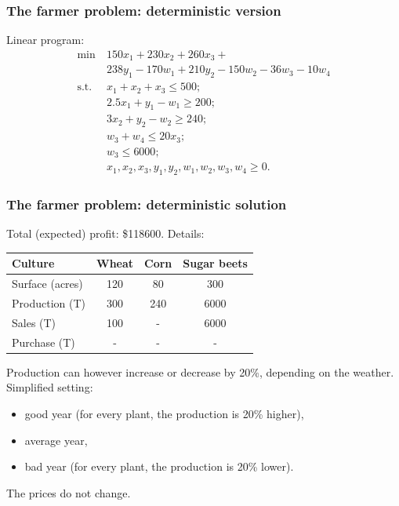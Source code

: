 \documentclass[aspectratio=169]{beamer}
\begin{document}
\begin{frame}
\frametitle{The farmer problem: deterministic version}

Linear program:
\begin{align*}
\min\ & 150x_1 + 230x_2 + 260x_3 +\\
&  238y_1 - 170w_1 + 210y_2 - 150w_2 -36w_3 - 10w_4 \\
\text{s.t. } & x_1 + x_2 + x_3 \leq 500; \\
& 2.5x_1 + y_1 - w_1 \geq 200; \\
& 3x_2 + y_2 - w_2 \geq 240; \\
& w_3 + w_4 \leq 20 x_3; \\
& w_3 \leq 6000; \\
& x_1, x_2, x_3, y_1, y_2, w_1, w_2, w_3, w_4 \geq 0.
\end{align*}

\end{frame}

\begin{frame}
\frametitle{The farmer problem: deterministic solution}

Total (expected) profit: \$118600. Details:
\begin{center}
\begin{tabular}{lccc}
\hline
Culture & Wheat & Corn & Sugar beets \\
\hline
Surface (acres) & 120 & 80 & 300 \\
Production (T) & 300 & 240 & 6000 \\
Sales (T) & 100 & - & 6000 \\
Purchase (T) & - & - & - \\
\hline
\end{tabular}
\end{center}

\mbox{}

Production can however increase or decrease by 20\%, depending on the weather.
Simplified setting:
\begin{itemize}
	\item 
good year (for every plant, the production is 20\% higher),
\item
average year,
\item
bad year (for every plant, the production is 20\% lower).
\end{itemize}
The prices do not change.
\end{frame}
\end{document}

